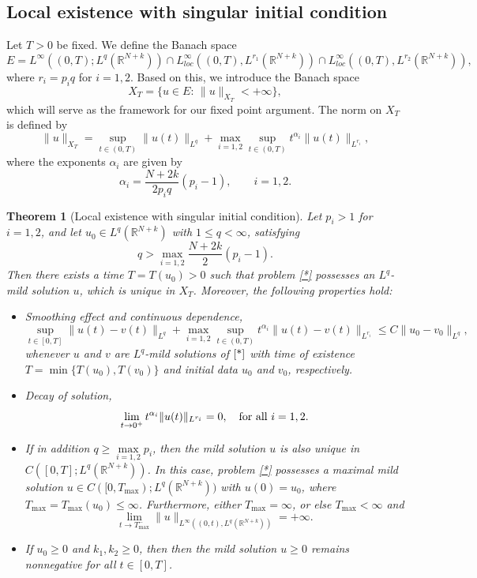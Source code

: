 \documentclass[a4,psfig,english,12pt,epsf,portrait]{article}
\newtheorem{theorem}{Theorem}[section]
\numberwithin{equation}{section}
\def\R{{\mathbb {R}}}
\def\R{\mathbb{R}}
\begin{document}

\subsection{Local existence with singular initial condition}
Let $T>0$ be fixed. We define the Banach space
$$E=L^\infty((0,T);L^q(\R^{N+k}))\cap L^\infty_{loc}((0,T), L^{r_1}(\R^{N+k}))\cap L^\infty_{loc}((0,T), L^{r_2}(\R^{N+k})),$$
where $r_i=p_i q$ for $i=1,2$.  Based on this, we introduce the Banach space 
\begin{equation*}
	X_T=\{u \in E:\,\|u\|_{X_T}<+\infty\},
\end{equation*}
which will serve as the framework for our fixed point argument. The norm on $X_T$ is defined by
$$\|u\|_{X_T}= \sup_{t \in (0,T)}\|u(t)\|_{L^{q}}+\max_{i=1,2} \sup_{t \in (0,T)}t^{\alpha_i}\|u(t)\|_{L^{r_i}},$$
where the exponents $\alpha_i$ are given by 
$$\alpha_i=\frac{N+2k}{2p_i q}\left(p_i-1\right),\qquad i=1,2.$$
\begin{theorem}[Local existence with singular initial condition]\label{teoexun}
	Let $p_i>1$ for $i=1,2$, and let $u_0 \in L^q(\R^{N+k})$ with $1\leq q <\infty$, satisfying
	$$q>\max\limits_{i=1,2}\frac{N+2k}{2}(p_i-1).$$
	Then there exists a time $T=T(u_0)>0$ such that problem \eqref{*} possesses an $L^q$-mild solution $u$, which is unique in $X_T$. Moreover, the following properties hold:
	\begin{itemize}
		\item[$\mathrm{(i)}$] Smoothing effect and continuous dependence,
		\begin{equation}\label{contdep}
			\sup_{t \in [0,T]} \|u(t)-v(t)\|_{L^q}+\max_{i=1,2} \sup_{t \in (0,T)}t^{\alpha_i}\|u(t)-v(t)\|_{L^{r_i}} \leq C\|u_0-v_0\|_{L^q} ,
		\end{equation}
		whenever $u$ and $v$ are $L^q$-mild solutions of $\eqref{*}$ with time of existence $T=\min\{T(u_0),T(v_0)\}$ and initial data $u_0$ and $v_0$, respectively.
		\item[$\mathrm{(ii)}$]  Decay of solution,
		\begin{equation}\label{conv}
			\lim_{t\rightarrow0^+} t^{\alpha_i}\|u(t)\|_{L^{r_i}} =0,\quad\hbox{for all}\,\,i=1,2.
		\end{equation}
		\item[$\mathrm{(iii)}$] If in addition $q\geq \max\limits_{i=1,2}  p_i$, then the mild solution  $u$ is also unique in $C([0,T];L^q(\R^{N+k}))$. In this case, problem \eqref{*} possesses a maximal mild solution $u\in C([0,T_{\max});L^q(\R^{N+k}))$ with $u(0)=u_0$, where $T_{\max}=T_{\max}(u_0)\leq\infty$. Furthermore, either $T_{\max}=\infty$, or else $T_{\max}<\infty$ and
		\begin{equation}\label{limblowup}
			\lim_{t\rightarrow T_{\max}^-}\|u\|_{L^\infty((0,t),L^q(\mathbb{R}^{N+k}))}=+\infty.
		\end{equation}
		\item[$\mathrm{(iv)}$] If $u_0\geq0$ and $k_1,k_2\geq0$, then then the mild solution $u\geq0$ remains nonnegative for all $t\in[0,T]$.
	\end{itemize}
\end{theorem}
\end{document}
